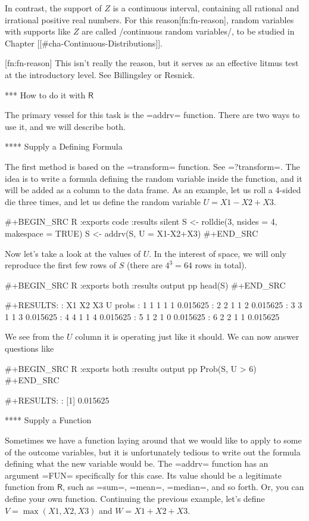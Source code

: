 In contrast, the support of \(Z\) is a continuous interval, containing
all rational and irrational positive real numbers. For this
reason[fn:fn-reason], random variables with supports like \(Z\) are
called /continuous random variables/, to be studied in Chapter
[[#cha-Continuous-Distributions]].

[fn:fn-reason] This isn't really the reason, but it serves as an
effective litmus test at the introductory level. See Billingsley or
Resnick.

*** How to do it with \(\mathsf{R}\)

The primary vessel for this task is the =addrv= function. There are
two ways to use it, and we will describe both.

**** Supply a Defining Formula

The first method is based on the =transform= function. See
=?transform=. The idea is to write a formula defining the random
variable inside the function, and it will be added as a column to the
data frame. As an example, let us roll a 4-sided die three times, and
let us define the random variable \(U=X1-X2+X3\).

#+BEGIN_SRC R :exports code :results silent
S <- rolldie(3, nsides = 4, makespace = TRUE) 
S <- addrv(S, U = X1-X2+X3) 
#+END_SRC 

Now let's take a look at the values of \(U\). In the interest of
space, we will only reproduce the first few rows of \(S\) (there are
\(4^{3}=64\) rows in total).

#+BEGIN_SRC R :exports both :results output pp   
head(S)
#+END_SRC 

#+RESULTS:
:   X1 X2 X3 U    probs
: 1  1  1  1 1 0.015625
: 2  2  1  1 2 0.015625
: 3  3  1  1 3 0.015625
: 4  4  1  1 4 0.015625
: 5  1  2  1 0 0.015625
: 6  2  2  1 1 0.015625

We see from the \(U\) column it is operating just like it should. We
can now answer questions like

#+BEGIN_SRC R :exports both :results output pp   
Prob(S, U > 6) 
#+END_SRC 

#+RESULTS:
: [1] 0.015625

**** Supply a Function

Sometimes we have a function laying around that we would like to apply
to some of the outcome variables, but it is unfortunately tedious to
write out the formula defining what the new variable would be. The
=addrv= function has an argument =FUN= specifically for this case. Its
value should be a legitimate function from \(\mathsf{R}\), such as
=sum=, =mean=, =median=, and so forth. Or, you can define your own
function. Continuing the previous example, let's define
\(V=\max(X1,X2,X3)\) and \(W=X1+X2+X3\).

